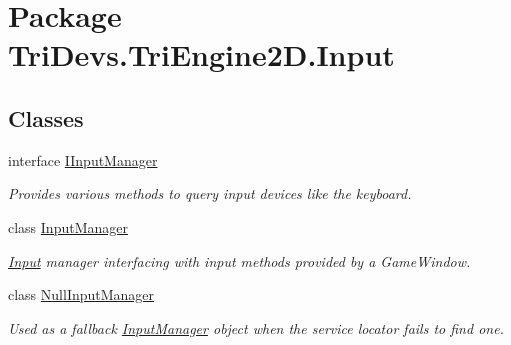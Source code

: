 \hypertarget{namespace_tri_devs_1_1_tri_engine2_d_1_1_input}{\section{Package Tri\-Devs.\-Tri\-Engine2\-D.\-Input}
\label{namespace_tri_devs_1_1_tri_engine2_d_1_1_input}
}
\subsection*{Classes}
\begin{DoxyCompactItemize}
\item 
interface \hyperlink{interface_tri_devs_1_1_tri_engine2_d_1_1_input_1_1_i_input_manager}{I\-Input\-Manager}
\begin{DoxyCompactList}\small\item\em Provides various methods to query input devices like the keyboard. \end{DoxyCompactList}\item 
class \hyperlink{class_tri_devs_1_1_tri_engine2_d_1_1_input_1_1_input_manager}{Input\-Manager}
\begin{DoxyCompactList}\small\item\em \hyperlink{namespace_tri_devs_1_1_tri_engine2_d_1_1_input}{Input} manager interfacing with input methods provided by a Game\-Window. \end{DoxyCompactList}\item 
class \hyperlink{class_tri_devs_1_1_tri_engine2_d_1_1_input_1_1_null_input_manager}{Null\-Input\-Manager}
\begin{DoxyCompactList}\small\item\em Used as a fallback \hyperlink{class_tri_devs_1_1_tri_engine2_d_1_1_input_1_1_input_manager}{Input\-Manager} object when the service locator fails to find one. \end{DoxyCompactList}\end{DoxyCompactItemize}
